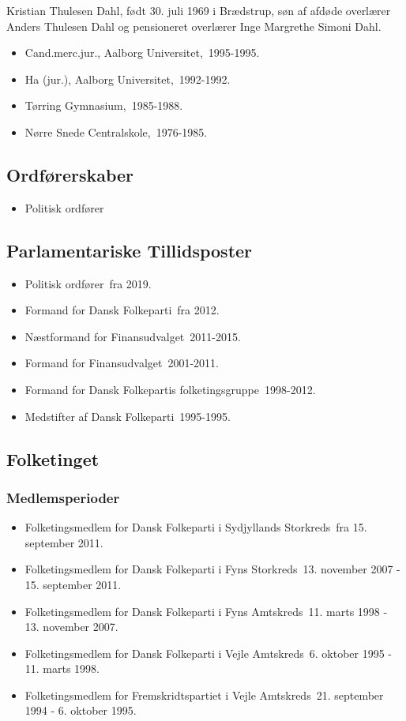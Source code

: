 \documentclass[11pt, a4paper]{awesome-cv}
\begin{document}
\makecvheader[R]
\makelettertitle
\begin{cvletter}
Kristian  Thulesen Dahl, født 30. juli 1969 i Brædstrup, søn af afdøde overlærer Anders Thulesen Dahl og pensioneret overlærer Inge Margrethe Simoni Dahl.

\begin{itemize}
\item Cand.merc.jur., Aalborg Universitet, 1995-1995.
\item Ha (jur.), Aalborg Universitet, 1992-1992.
\item Tørring Gymnasium, 1985-1988.
\item Nørre Snede Centralskole, 1976-1985.
\end{itemize}
\subsection*{Ordførerskaber}
\begin{itemize}
\item Politisk ordfører
\end{itemize}
\subsection*{Parlamentariske Tillidsposter}
\begin{itemize}
\item Politisk ordfører fra 2019.
\item Formand for Dansk Folkeparti fra 2012.
\item Næstformand for Finansudvalget 2011-2015.
\item Formand for Finansudvalget 2001-2011.
\item Formand for Dansk Folkepartis folketingsgruppe 1998-2012.
\item Medstifter af Dansk Folkeparti 1995-1995.
\end{itemize}
\subsection*{Folketinget}
\subsubsection*{Medlemsperioder}
\begin{itemize}
\item Folketingsmedlem for Dansk Folkeparti i Sydjyllands Storkreds fra 15. september 2011.
\item Folketingsmedlem for Dansk Folkeparti i Fyns Storkreds 13. november 2007 - 15. september 2011.
\item Folketingsmedlem for Dansk Folkeparti i Fyns Amtskreds 11. marts 1998 - 13. november 2007.
\item Folketingsmedlem for Dansk Folkeparti i Vejle Amtskreds 6. oktober 1995 - 11. marts 1998.
\item Folketingsmedlem for Fremskridtspartiet i Vejle Amtskreds 21. september 1994 - 6. oktober 1995.
\end{itemize}

\end{cvletter}
\end{document}

